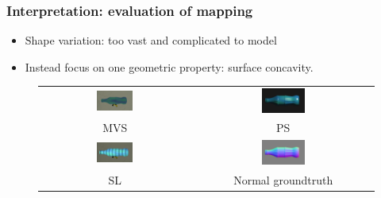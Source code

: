\documentclass{beamer}
\begin{document}
\begin{frame}
\frametitle{Interpretation: evaluation of mapping}

\begin{itemize}
\item Shape variation: too vast and complicated to model
\item Instead focus on one geometric property: surface concavity.
\end{itemize}

\begin{figure}[!htbp]
\centering
\begin{tabular}{cc}
  \includegraphics[width=0.25\textwidth]{interp/synth_data/bottle/bottle_mvs}&
  \includegraphics[width=0.25\textwidth]{interp/synth_data/bottle/bottle_ps}\\
  MVS & PS\\
  \includegraphics[width=0.25\textwidth]{interp/synth_data/bottle/bottle_sl}&
  \includegraphics[width=0.25\textwidth]{interp/synth_data/bottle/bottle_ps_gt}\\
  SL & Normal groundtruth\\
\end{tabular}
\end{figure}

\end{frame}
\end{document}
